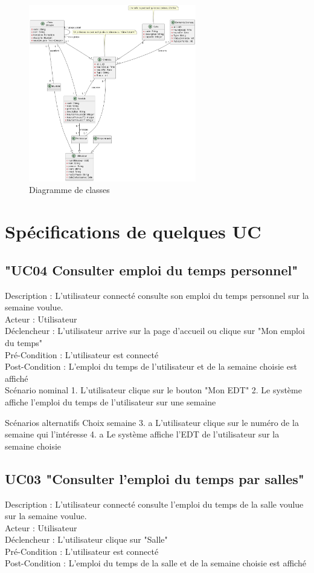 \documentclass[a4paper,12pt]{article}
\begin{document}
\begin{figure}[!ht]
    \centering
    \includegraphics[width=0.65\textwidth]{classes.png}
    \caption{Diagramme de classes}
    \label{fig:uml_classes}
\end{figure}

\section {Spécifications de quelques UC}

\subsection{"UC04 Consulter emploi du temps personnel"}
Description : L'utilisateur connecté consulte son emploi du temps personnel sur la semaine voulue.\\
Acteur : Utilisateur \\
Déclencheur : L'utilisateur arrive sur la page d'accueil ou clique sur "Mon emploi du temps"\\
Pré-Condition : L'utilisateur est connecté\\
Post-Condition : L'emploi du temps de l'utilisateur et de la semaine choisie est affiché\\

Scénario nominal
1. L'utilisateur clique sur le bouton "Mon EDT"
2. Le système affiche l'emploi du temps de l'utilisateur sur une semaine

Scénarios alternatifs
Choix semaine
3. a L'utilisateur clique sur le numéro de la semaine qui l'intéresse
4. a Le système affiche l'EDT de l'utilisateur sur la semaine choisie

\subsection{UC03 "Consulter l'emploi du temps par salles"}
Description : L'utilisateur connecté consulte l'emploi du temps de la salle voulue sur la semaine voulue.\\
Acteur : Utilisateur \\
Déclencheur : L'utilisateur clique sur "Salle"\\
Pré-Condition : L'utilisateur est connecté\\
Post-Condition : L'emploi du temps de la salle et de la semaine choisie est affiché
\\
\end{document}

